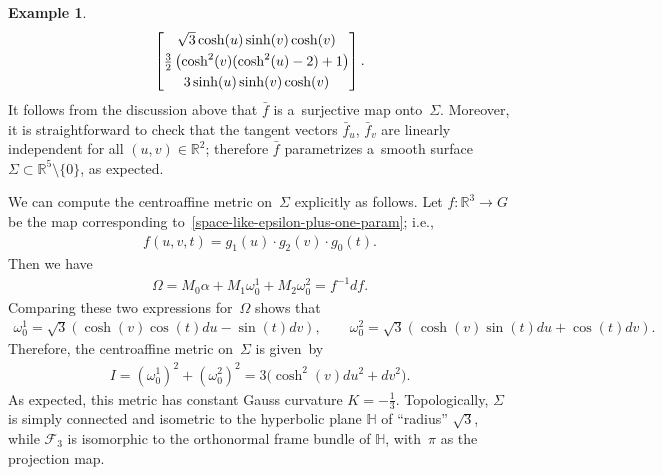 \documentclass[pdftex]{sigma}
\numberwithin{equation}{section}
\theoremstyle{definition}
\newtheorem{exmpl}[teo]{Example}
\begin{document}
\begin{exmpl}
\begin{gather}
\begin{bmatrix}
\sqrt{3} \cosh(u) \sinh(v) \cosh(v)
\vspace{1mm}\\
\tfrac{3}{2}\left(\cosh^2(v) (\cosh^2(u) - 2) + 1 \right)
\vspace{1mm}\\
3 \sinh(u) \sinh(v) \cosh(v)
\end{bmatrix}.
\label{space-like-epsilon-plus-one-param}
\end{gather}
It follows from the discussion above that $\bar{f}$ is a~surjective map onto~$\Sigma$.
Moreover, it is straightforward to check that the tangent vectors $\bar{f}_u$, $\bar{f}_v$ are linearly independent for
all $(u,v) \in \mathbb{R}^2$; therefore $\bar{f}$ parametrizes a~smooth surface $\Sigma \subset \mathbb{R}^5 \setminus
\{0 \}$, as expected.

We can compute the centroaf\/f\/ine metric on~$\Sigma$ explicitly as follows.
Let $f:\mathbb{R}^3 \to G$ be the map corresponding to~\eqref{space-like-epsilon-plus-one-param}; i.e.,
\begin{gather*}
f(u,v,t) = g_1(u) \cdot g_2(v) \cdot g_0(t).
\end{gather*}
Then we have
\begin{gather*}
\Omega = M_0  \alpha + M_1  \omega^1_0 + M_2  \omega^2_0 = f^{-1}  df.
\end{gather*}
Comparing these two expressions for~$\Omega$ shows that
\begin{gather*}
\omega^1_0 = \sqrt{3}\left(\cosh (v) \cos(t)   du - \sin(t)  dv \right),
\qquad
\omega^2_0 = \sqrt{3}\left(\cosh (v) \sin(t)  du + \cos(t)  dv \right).
\end{gather*}
Therefore, the centroaf\/f\/ine metric on~$\Sigma$ is given~by
\begin{gather*}
I = \left(\omega^1_0\right)^2 + \left(\omega^2_0\right)^2 = 3\big(\cosh^2(v)  du^2 + dv^2\big).
\end{gather*}
As expected, this metric has constant Gauss curvature $K = -\frac{1}{3}$.
Topologically, $\Sigma$ is simply connected and isometric to the hyperbolic plane $\mathbb{H}$ of ``radius'' $\sqrt{3}$,
while $\mathcal{F}_3$ is isomorphic to the orthonormal frame bundle of $\mathbb{H}$, with~$\pi$ as the projection map.


\end{exmpl}
\end{document}
